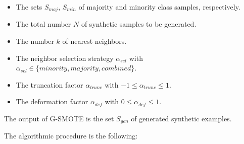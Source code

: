 \documentclass[parskip=full]{scrartcl}
\begin{document}
\begin{itemize}

\renewcommand\labelitemi{--}

\item The sets \( S_{maj} \),  \( S_{min} \) of majority and minority class
samples, respectively.

\item The total number \( N \) of synthetic samples to be generated.

\item The number \( k \) of nearest neighbors.

\item The neighbor selection strategy \( \alpha_{sel} \) with \( \alpha_{sel}
\in \Big\{ minority, majority, combined \Big\} \).

\item The truncation factor \( \alpha_{trunc} \) with \( -1 \leq \alpha_{trunc}
\leq 1 \). 

\item The deformation factor \( \alpha_{def} \) with \( 0 \leq \alpha_{def} \leq
1 \).

\end{itemize}

The output of G-SMOTE is the set \( S_{gen} \) of generated synthetic examples.

The algorithmic procedure is the following:
\end{document}
